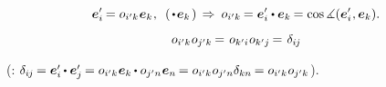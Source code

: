 \nopagebreak\vspace{-0.25em}\begin{equation}
\bm{e}'_{i} \hspace{-0.16ex} = \cosinematrix{i'k} \hspace{.1ex} \bm{e}_k \hspace{0.1ex}, \;\:
(\hspace{0.32ex} \dotp \hspace{.25ex} \bm{e}_k \hspace{0.25ex}) \,\Rightarrow\: \cosinematrix{i'k} \hspace{-0.16ex} = \bm{e}'_{i} \dotp \bm{e}_k \hspace{-0.16ex} = \operatorname{cos} \measuredangle (\bm{e}'_{i} \hspace{.1ex}, \bm{e}_k).
\end{equation}



\vspace{-0.64em}\begin{equation}\label{orthogonalityofcosinematricies}
o_{i'k} \hspace{.1ex} o_{j'k} \hspace{-0.16ex} = \hspace{.2ex} o_{k'i} \hspace{.1ex} o_{k'j} \hspace{-0.16ex} = \hspace{.2ex} \delta_{i\hspace{-0.1ex}j}
\end{equation}

\vspace{-0.2em} \noindent (: $\delta_{i\hspace{-0.1ex}j} \hspace{-0.15ex} = \bm{e}'_i \hspace{-0.12ex} \dotp \bm{e}'_j \hspace{-0.16ex} = \cosinematrix{i'k} \hspace{.1ex} \bm{e}_k \hspace{-0.12ex} \dotp \cosinematrix{j'n} \hspace{.1ex} \bm{e}_n \hspace{-0.16ex} = \cosinematrix{i'k} \hspace{.1ex} \cosinematrix{j'n} \delta_{kn} \hspace{-0.16ex} = \cosinematrix{i'k} \hspace{.1ex} \cosinematrix{j'k} \hspace{0.1ex}$).

